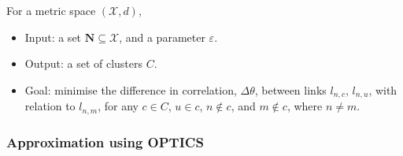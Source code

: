 For a metric space $(\mathcal{X}, d)$,
\begin{itemize}
    \item Input: a set $\textbf{N} \subseteq \mathcal{X}$, and a parameter $\varepsilon$.
    \item Output: a set of clusters $C$. %
    \item Goal: minimise the difference in correlation, $\Delta\theta$, between links $l_{n,c}$, $l_{n,u}$, with relation to $l_{n, m}$, for any $c \in C$, $u \in c$, $n \not\in c$, and $m \not\in c$, where $n \neq m$.


\end{itemize}


\subsubsection{Approximation using OPTICS}

